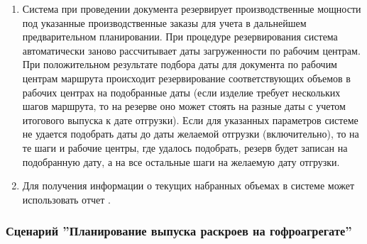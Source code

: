 \begin{enumerate}
\item	Система \gofro при проведении документа  резервирует производственные мощности под указанные производственные заказы для учета в дальнейшем предварительном планировании. При процедуре резервирования система \gofro автоматически заново рассчитывает даты загруженности по рабочим центрам. При положительном результате подбора даты для документа  по рабочим центрам маршрута происходит резервирование соответствующих объемов в рабочих центрах на подобранные даты (если изделие требует нескольких шагов маршрута, то на резерве оно может стоять на разные даты с учетом итогового выпуска к дате отгрузки). Если для указанных параметров системе \gofro не удается подобрать даты до даты желаемой отгрузки (включительно), то на те шаги и рабочие центры, где удалось подобрать, резерв будет записан на подобранную дату, а на все остальные шаги на желаемую дату отгрузки.
\item	Для получения информации о текущих набранных объемах \manager в системе \gofro может использовать отчет .


\end{enumerate}

\fi





\subsubsection{Сценарий ''Планирование выпуска раскроев на гофроагрегате''}
\label{bp:plan_3}


